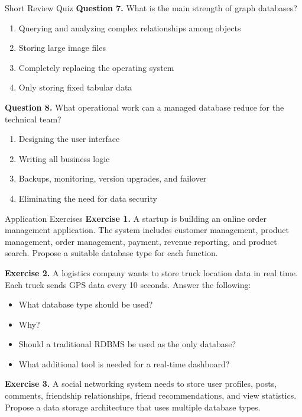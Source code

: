 \documentclass[aspectratio=169,11pt]{beamer}
\newcommand{\smallitem}{\setlength{\itemsep}{2pt}\setlength{\parskip}{0pt}}
\newcommand{\qoption}[2]{\item[#1.] #2}
\begin{document}
\begin{frame}[allowframebreaks]{Short Review Quiz}
\textbf{Question 7.} What is the main strength of graph databases?
\begin{enumerate}
  \qoption{A}{Querying and analyzing complex relationships among objects}
  \qoption{B}{Storing large image files}
  \qoption{C}{Completely replacing the operating system}
  \qoption{D}{Only storing fixed tabular data}
\end{enumerate}

\textbf{Question 8.} What operational work can a managed database reduce for the technical team?
\begin{enumerate}
  \qoption{A}{Designing the user interface}
  \qoption{B}{Writing all business logic}
  \qoption{C}{Backups, monitoring, version upgrades, and failover}
  \qoption{D}{Eliminating the need for data security}
\end{enumerate}
\end{frame}

\begin{frame}[allowframebreaks]{Application Exercises}
\small
\textbf{Exercise 1.} A startup is building an online order management application. The system includes customer management, product management, order management, payment, revenue reporting, and product search. Propose a suitable database type for each function.

\vspace{3mm}
\textbf{Exercise 2.} A logistics company wants to store truck location data in real time. Each truck sends GPS data every 10 seconds. Answer the following:
\begin{itemize}
  \smallitem
  \item What database type should be used?
  \item Why?
  \item Should a traditional RDBMS be used as the only database?
  \item What additional tool is needed for a real-time dashboard?
\end{itemize}

\vspace{3mm}
\textbf{Exercise 3.} A social networking system needs to store user profiles, posts, comments, friendship relationships, friend recommendations, and view statistics. Propose a data storage architecture that uses multiple database types.
\end{frame}
\end{document}
